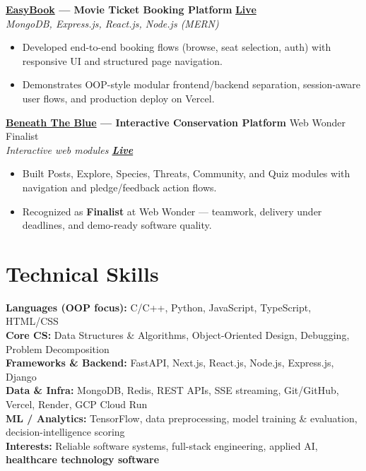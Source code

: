 \documentclass[a4paper,10pt]{article}
\begin{document}
\vspace{0.8mm}
\noindent\textbf{\href{https://easy-book-kappa.vercel.app/}{EasyBook} --- Movie Ticket Booking Platform}
\hfill \href{https://easy-book-kappa.vercel.app/}{\textbf{\small Live}}\\
\textit{\small MongoDB, Express.js, React.js, Node.js (MERN)}\\[0.4mm]
\begin{itemize}
  \item Developed end-to-end booking flows (browse, seat selection, auth) with responsive UI and structured page navigation.
  \item Demonstrates OOP-style modular frontend/backend separation, session-aware user flows, and production deploy on Vercel.
\end{itemize}

\vspace{0.8mm}
\noindent\textbf{\href{https://beneath-the-blue-1-3c6o.onrender.com/}{Beneath The Blue} --- Interactive Conservation Platform}
\hfill {\small Web Wonder Finalist}\\
\textit{\small Interactive web modules \textbar{} \href{https://beneath-the-blue-1-3c6o.onrender.com/}{\textbf{Live}}}\\[0.4mm]
\begin{itemize}
  \item Built Posts, Explore, Species, Threats, Community, and Quiz modules with navigation and pledge/feedback action flows.
  \item Recognized as \textbf{Finalist} at Web Wonder --- teamwork, delivery under deadlines, and demo-ready software quality.
\end{itemize}

\section{Technical Skills}
\noindent\small
\textbf{Languages (OOP focus):} C/C++, Python, JavaScript, TypeScript, HTML/CSS \\[0.35mm]
\textbf{Core CS:} Data Structures \& Algorithms, Object-Oriented Design, Debugging, Problem Decomposition \\[0.35mm]
\textbf{Frameworks \& Backend:} FastAPI, Next.js, React.js, Node.js, Express.js, Django \\[0.35mm]
\textbf{Data \& Infra:} MongoDB, Redis, REST APIs, SSE streaming, Git/GitHub, Vercel, Render, GCP Cloud Run \\[0.35mm]
\textbf{ML / Analytics:} TensorFlow, data preprocessing, model training \& evaluation, decision-intelligence scoring \\[0.35mm]
\textbf{Interests:} Reliable software systems, full-stack engineering, applied AI, \textbf{healthcare technology software}
\end{document}
